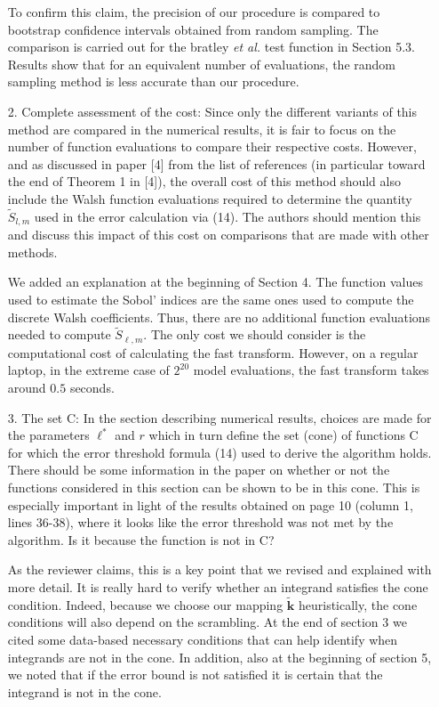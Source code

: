 \documentclass[10pt,a4paper]{article}
\newcommand{\vect}[1]{\boldsymbol{\mathbf{#1}}}
\newcommand{\vk}{\vect{k}}
\newcommand{\answer}[1]{{\color{blue} #1 }}
\begin{document}
\begin{itemize}
{To confirm this claim, the precision of our procedure is compared to bootstrap confidence intervals obtained from random sampling. The comparison is carried out for the bratley \textit{et al.} test function in Section 5.3. Results show that for an equivalent number of evaluations, the random sampling method is less accurate than our procedure.}



\item[2.] Complete assessment of the cost: Since only the different variants of this method are compared in the numerical results, it is fair to focus on the number of function evaluations to compare their respective costs. However, and as discussed in paper [4] from the list of references (in particular toward the end of Theorem 1 in [4]), the overall cost of this method should also include the Walsh function evaluations required to determine the quantity $\widetilde{S}_{l,m}$ used in the error calculation via (14). The authors should mention this and discuss this impact of this cost on comparisons that are made with other methods.

\answer{We added an explanation at the beginning of Section 4. The function values used to estimate the Sobol' indices are the same ones used to compute the discrete Walsh coefficients. Thus, there are no additional function evaluations needed to compute $\widetilde{S}_{\ell,m}$. The only cost we should consider is the computational cost of calculating the fast transform. However, on a regular laptop, in the extreme case of $2^{20}$ model evaluations, the fast transform takes around $0.5$ seconds.}

\item[3.]The set C: In the section describing numerical results, choices are made for the parameters $\ell^*$ and $r$ which in turn define the set (cone) of functions C for which the error threshold formula (14) used to derive the algorithm holds. There should be some information in the paper on whether or not the functions considered in this section can be shown to be in this cone. This is especially important in light of the results obtained on page 10 (column 1, lines 36-38), where it looks like the error threshold was not met by the algorithm. Is it because the function is not in C?

\answer{As the reviewer claims, this is a key point that we revised and explained with more detail. It is really hard to verify whether an integrand satisfies the cone condition. Indeed, because we choose our mapping $\tilde{\vk}$ heuristically, the cone conditions will also depend on the scrambling. At the end of section 3 we cited some data-based necessary conditions that can help identify when integrands are not in the cone. In addition, also at the beginning of section 5, we noted that if the error bound is not satisfied it is certain that the integrand is not in the cone.}
\end{itemize}
\end{document}
